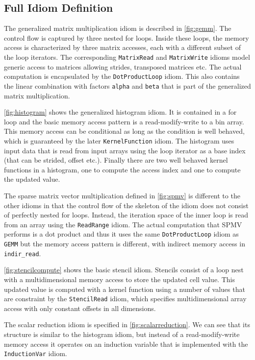 \subsection{Full Idiom Definition}
The generalized matrix multiplication idiom is described in \autoref{fig:gemm}.
The control flow is captured by three nested for loops.
Inside these loops, the memory access is characterized by three matrix accesses, each with a different subset of the
loop iterators.
The corresponding \texttt{MatrixRead} and \texttt{MatrixWrite} idioms model generic access to matrices allowing
strides, transposed matrices etc.
The actual computation is encapsulated by the \texttt{DotProductLoop} idiom.
This also contains the linear combination with factors \texttt{alpha} and \texttt{beta} that is part of the generalized
matrix multiplication.

\autoref{fig:histogram} shows the generalized histogram idiom.
It is contained in a for loop and the basic memory access pattern is a read-modify-write to a bin array.
This memory access can be conditional as long as the condition is well behaved, which is guaranteed by the later
\texttt{KernelFunction} idiom.
The histogram uses input data that is read from input arrays using the loop iterator as a base index (that can be
strided, offset etc.).
Finally there are two well behaved kernel functions in a histogram, one to compute the access index and one to compute
the updated value.

The sparse matrix vector multiplication defined in \autoref{fig:spmv} is different to the other idioms in that
the control flow of the skeleton of the idiom does not consist of perfectly nested for loops.
Instead, the iteration space of the inner loop is read from an array using the \texttt{ReadRange} idiom.
The actual computation that SPMV performs is a dot product and thus it uses the same \texttt{DotProductLoop} idiom as
\texttt{GEMM} but the memory access pattern is different, with indirect memory access in \texttt{indir\_read}.

\autoref{fig:stencilcompute} shows the basic stencil idiom.
Stencils consist of a loop nest with a multidimensional memory access to store the updated cell value.
This updated value is computed with a kernel function using a number of values that are constraint by the
\texttt{StencilRead} idiom, which specifies multidimensional array access with only constant offsets in all dimensions.

The scalar reduction idiom is specified in \autoref{fig:scalarreduction}.
We can see that its structure is similar to the histogram idiom, but instead of a read-modify-write memory access
it operates on an induction variable that is implemented with the \texttt{InductionVar} idiom.

